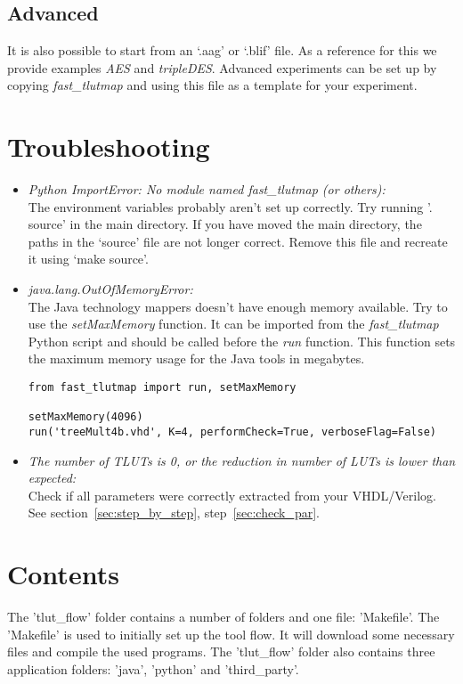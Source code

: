 \documentclass[a4paper,oneside]{memoir}
\begin{document}
\section{Advanced}
It is also possible to start from an `.aag' or `.blif' file. As a reference for this we provide examples \emph{AES} and \emph{tripleDES}. 
Advanced experiments can be set up by copying \emph{fast\_tlutmap} and using this file as a template for your experiment.

\clearpage
\chapter{Troubleshooting}\label{sec:troubleshooting}
\begin{itemize}
\item \emph{Python ImportError: No module named fast\_tlutmap (or others):}\\
The environment variables probably aren't set up correctly. Try running '. source' in the main directory. 
If you have moved the main directory, the paths in the `source' file are not longer correct. Remove this file and recreate it using `make source'.

\item \emph{java.lang.OutOfMemoryError:}\\
The Java technology mappers doesn't have enough memory available. Try to use the \emph{setMaxMemory} function. It can be imported from the \emph{fast\_tlutmap} Python script and should be called before the \emph{run} function. This function sets the maximum memory usage for the Java tools in megabytes.
\lstset{language=python}
\begin{lstlisting}
from fast_tlutmap import run, setMaxMemory

setMaxMemory(4096)
run('treeMult4b.vhd', K=4, performCheck=True, verboseFlag=False)
\end{lstlisting}

\item \emph{The number of TLUTs is 0, or the reduction in number of LUTs is lower than expected:}\\
Check if all parameters were correctly extracted from your VHDL/Verilog. See section~\ref{sec:step_by_step}, step~\ref{sec:check_par}.
\end{itemize}

\clearpage
\chapter{Contents}\label{sec:contents}
The 'tlut\_flow' folder contains a number of folders and one file: 'Makefile'. The 'Makefile' is used to initially set up the tool flow. It will download some necessary files and compile the used programs.
The 'tlut\_flow' folder also contains three application folders: 'java', 'python' and 'third\_party'.
\end{document}
